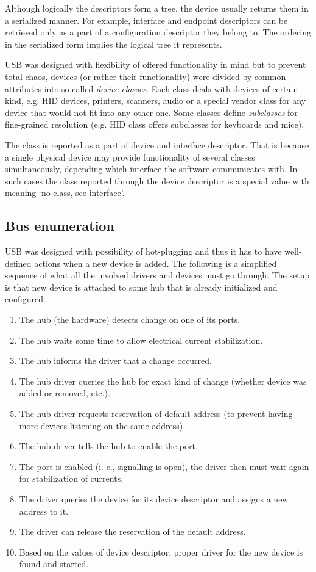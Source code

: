 Although logically the descriptors form a tree, the device usually returns them
in a serialized manner. For example, interface and endpoint descriptors can be
retrieved only as a part of a configuration descriptor they belong to. The
ordering in the serialized form implies the logical tree it represents.

USB was designed with flexibility of offered functionality in mind but to
prevent total chaos, devices (or rather their functionality) were divided by
common attributes into so called \textit{device classes}. Each class deals with
devices of certain kind, e.g. HID devices, printers, scanners, audio or a
special vendor class for any device that would not fit into any other one. Some
classes define \textit{subclasses} for fine-grained resolution (e.g. HID class
offers subclasses for keyboards and mice).

The class is reported as a part of device and interface descriptor. That is
because a single physical device may provide functionality of several classes
simultaneously, depending which interface the software communicates with. In
such cases the class reported through the device descriptor is a special value
with meaning ‘no class, see interface’.

\subsection{Bus enumeration}

USB was designed with possibility of hot-plugging and thus it has to have
well-defined actions when a new device is added. The following is a simplified
sequence of what all the involved drivers and devices must go through. The
setup is that new device is attached to some hub that is already initialized
and configured.

\begin{enumerate}
\item The hub (the hardware) detects change on one of its ports.
\item The hub waits some time to allow electrical current stabilization.
\item The hub informs the driver that a change occurred.
\item The hub driver queries the hub for exact kind of change (whether device
was added or removed, etc.).
\item The hub driver requests reservation of default address (to prevent having
more devices listening on the same address).
\item The hub driver tells the hub to enable the port.
\item The port is enabled (i. e., signalling is open), the driver then must wait
again for stabilization of currents.
\item The driver queries the device for its device descriptor and assigns a new
address to it.
\item The driver can release the reservation of the default address.
\item Based on the values of device descriptor, proper driver for the new
device is found and started.
\end{enumerate}

